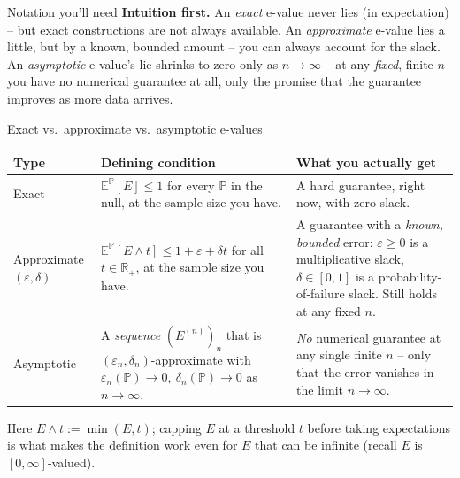 \documentclass[aspectratio=169,10pt]{beamer}
\newcommand{\R}{\mathbb{R}}
\newcommand{\E}{\mathbb{E}}
\newcommand{\Pb}{\mathbb{P}}
\begin{document}
\begin{frame}[allowframebreaks]{Notation you'll need}
  \textbf{Intuition first.} An \emph{exact} e-value never lies (in expectation) -- but exact constructions are not always available. An \emph{approximate} e-value lies a little, but by a known, bounded amount -- you can always account for the slack. An \emph{asymptotic} e-value's lie shrinks to zero only as $n\to\infty$ -- at any \emph{fixed}, finite $n$ you have no numerical guarantee at all, only the promise that the guarantee improves as more data arrives.

  \begin{block}{Exact vs.\ approximate vs.\ asymptotic e-values}
    \begin{tabular}{@{}p{2.1cm}p{4.6cm}p{4.6cm}@{}}
      \toprule
      \textbf{Type} & \textbf{Defining condition} & \textbf{What you actually get} \\
      \midrule
      Exact & $\E^{\Pb}[E] \leq 1$ for every $\Pb$ in the null, at the sample size you have. & A hard guarantee, right now, with zero slack. \\[0.15cm]
      Approximate $(\varepsilon,\delta)$ & $\E^{\Pb}[E \wedge t] \leq 1+\varepsilon+\delta t$ for all $t\in\R_+$, at the sample size you have. & A guarantee with a \emph{known, bounded} error: $\varepsilon\geq0$ is a multiplicative slack, $\delta\in[0,1]$ is a probability-of-failure slack. Still holds at any fixed $n$. \\[0.15cm]
      Asymptotic & A \emph{sequence} $(E^{(n)})_n$ that is $(\varepsilon_n,\delta_n)$-approximate with $\varepsilon_n(\Pb)\to0,\ \delta_n(\Pb)\to0$ as $n\to\infty$. & \emph{No} numerical guarantee at any single finite $n$ -- only that the error vanishes in the limit $n\to\infty$. \\
      \bottomrule
    \end{tabular}
  \end{block}
  Here $E\wedge t := \min(E,t)$; capping $E$ at a threshold $t$ before taking expectations is what makes the definition work even for $E$ that can be infinite (recall $E$ is $[0,\infty]$-valued).

  \framebreak


\end{frame}
\end{document}
